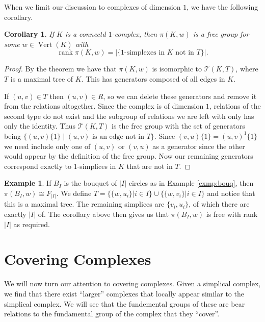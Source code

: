 \documentclass[12pt]{article}
\newtheorem{corollary}{Corollary}[theorem]
\theoremstyle{definition}
\newtheorem{example}{Example}[section]
\numberwithin{equation}{theorem}
\begin{document}
When we limit our discussion to complexes of dimension $1$, we have the following corollary.

\begin{corollary}
  \label{cor:1free}
  If $K$ is a connectd $1$-complex, then $\pi(K,w)$ is a free group for some $w \in \operatorname{Vert}(K)$ with
  \begin{equation*}
    \operatorname{rank} \pi(K,w) = |\{1 \text{-simplexes in } K \text{ not in } T \}|.
  \end{equation*}
\end{corollary}

\begin{proof}
  By the theorem we have that $\pi(K,w)$ is isomorphic to $\mathcal{T}(K,T)$, where $T$ is a maximal tree of $K$. This has generators composed of all edges in $K$.

  If $(u,v) \in T$ then $(u,v) \in R$, so we can delete these generators and remove it from the relations altogether. Since the complex is of dimension $1$, relations of the second type do not exist and the subgroup of relations we are left with only has only the identity. Thus $\mathcal{T}(K,T)$ is the free group with the set of generators being $\{(u,v) \{1\} \mid (u,v) \text{ is an edge not in } T\}$. Since $(v,u) \{1\} = (u,v)^{1} \{ 1 \}$ we need include only one of $(u,v)$ or $(v,u)$ as a generator since the other would appear by the definition of the free group. Now our remaining generators correspond exactly to $1$-simplices in $K$ that are not in $T$.
\end{proof}


\begin{example}
  \label{exmp:bouq-fund}
  If $B_I$ is the bouquet of $|I|$ circles as in Example \ref{exmp:bouq}, then $\pi(B_I,w) \cong F_{|I|}$. We define $T = \{ \{w,u_i \} | i \in I \} \cup \{ \{w,v_i \} | i \in I \}$ and notice that this is a maximal tree. The remaining simplices are $\{v_i,u_i\}$, of which there are exactly $|I|$ of. The corollary above then gives us that $\pi(B_I,w)$ is free with rank $|I|$ as required.
\end{example}

\section{Covering Complexes}
We will now turn our attention to covering complexes. Given a simplical complex, we find that there exist ``larger'' complexes that locally appear similar to the simplical complex. We will see that the fundemental groups of these are bear relations to the fundamental group of the complex that they ``cover''.
\end{document}
